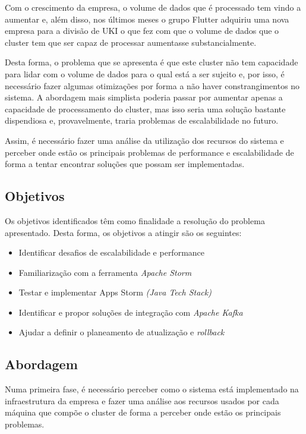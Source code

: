 Com o crescimento da empresa, o volume de dados que é processado tem vindo a aumentar e, além disso,
nos últimos meses o grupo Flutter adquiriu uma nova empresa para a divisão de \ac{UKI} o que fez 
com que o volume de dados que o \gls{cluster} tem que ser capaz de processar aumentasse 
substancialmente.

Desta forma, o problema que se apresenta é que este \gls{cluster} não tem capacidade para lidar
com o volume de dados para o qual está a ser sujeito e, por isso, é necessário fazer algumas
otimizações por forma a não haver constrangimentos no sistema. A abordagem mais simplista poderia 
passar por aumentar apenas a capacidade de processamento do \gls{cluster}, mas isso seria uma 
solução bastante dispendiosa e, provavelmente, traria problemas de escalabilidade no futuro.

Assim, é necessário fazer uma análise da utilização dos recursos do sistema e perceber onde estão 
os principais problemas de performance e escalabilidade de forma a tentar encontrar soluções que 
possam ser implementadas. 

\subsection{Objetivos}

Os objetivos identificados têm como finalidade a resolução do problema apresentado. Desta forma, 
os objetivos a atingir são os seguintes:

\begin{itemize}
  \item Identificar desafios de escalabilidade e performance
  \item Familiarização com a ferramenta \textit{Apache Storm }
  \item Testar e implementar Apps Storm \textit{(Java Tech Stack)}
  \item Identificar e propor soluções de integração com \textit{Apache Kafka}
  \item Ajudar a definir o planeamento de atualização e \textit{rollback}
\end{itemize}

\subsection{Abordagem}

Numa primeira fase, é necessário perceber como o sistema está implementado na infraestrutura da 
empresa e fazer uma análise aos recursos usados por cada máquina que compõe o \gls{cluster} de 
forma a perceber onde estão os principais problemas. 

